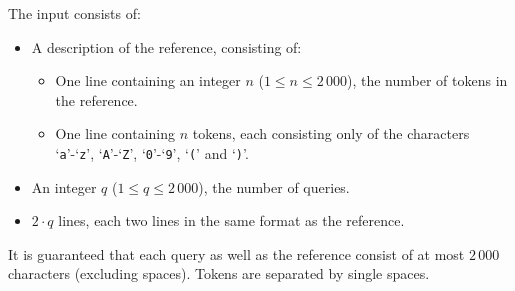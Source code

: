 
    The input consists of:
    \begin{itemize}
        \item A description of the reference, consisting of:
            \begin{itemize}
                \item One line containing an integer $n$ ($1\leq n \leq 2\,000$), the number of tokens in the reference.
                \item One line containing $n$ tokens, each consisting only of the characters `\texttt{a}'-`\texttt{z}', `\texttt{A}'-`\texttt{Z}', `\texttt{0}'-`\texttt{9}', `\texttt{(}' and `\texttt{)}'.
            \end{itemize}
        \item An integer $q$ ($1 \leq q \leq 2\,000$), the number of queries.
        \item $2\cdot q$ lines, each two lines in the same format as the reference.
    \end{itemize}
    It is guaranteed that each query as well as the reference consist of at most $2\,000$ characters (excluding spaces).
    Tokens are separated by single spaces.
